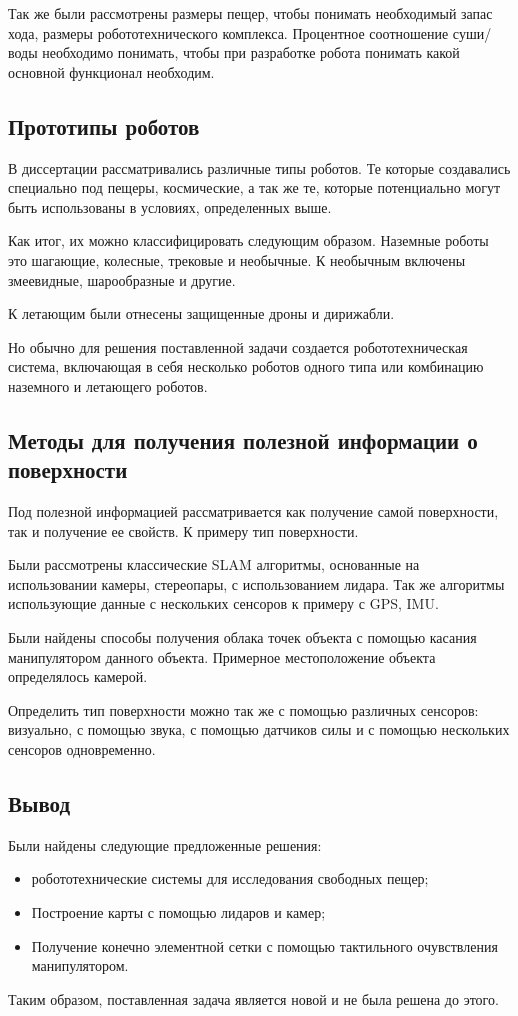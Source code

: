   Так же были рассмотрены размеры пещер, чтобы понимать необходимый запас хода, размеры робототехнического комплекса. Процентное соотношение суши/воды необходимо понимать, чтобы при разработке робота понимать какой основной функционал необходим.

\subsection{Прототипы роботов}

В диссертации рассматривались различные типы роботов. Те которые создавались специально под пещеры, космические, а так же те, которые потенциально могут быть использованы в условиях, определенных выше.

Как итог, их можно классифицировать следующим образом. Наземные роботы это шагающие, колесные, трековые и необычные. К необычным включены змеевидные, шарообразные и другие.

К летающим были отнесены защищенные дроны и дирижабли.

Но обычно для решения поставленной задачи создается робототехническая система, включающая в себя несколько роботов одного типа или комбинацию наземного и летающего роботов.

\subsection{Методы для получения полезной информации о поверхности}

Под полезной информацией рассматривается как получение самой поверхности, так и получение ее свойств. К примеру тип поверхности.

Были рассмотрены классические SLAM алгоритмы, основанные на использовании камеры, стереопары, с использованием лидара. Так же алгоритмы использующие данные с нескольких сенсоров к примеру с GPS, IMU.

Были найдены способы получения облака точек объекта с помощью касания манипулятором данного объекта. Примерное местоположение объекта определялось камерой.

Определить тип поверхности можно так же с помощью различных сенсоров: визуально, с помощью звука, с помощью датчиков силы и с помощью нескольких сенсоров одновременно.

\subsection{Вывод}
Были найдены следующие предложенные решения:
\begin{itemize}
    \item робототехнические системы для исследования свободных пещер;
    \item Построение карты с помощью лидаров и камер;
    \item Получение конечно элементной сетки с помощью тактильного очувствления манипулятором.
\end{itemize}

Таким образом, поставленная задача является новой и не была решена до этого.